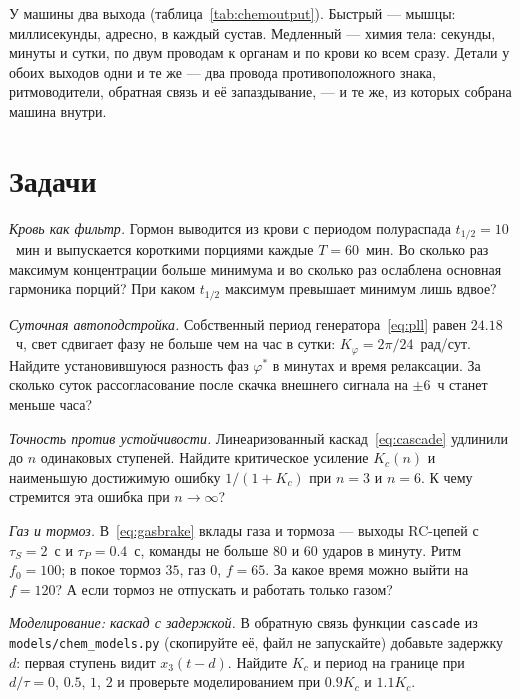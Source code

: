 У машины два выхода (таблица~\ref{tab:chemoutput}). Быстрый --- мышцы: миллисекунды, адресно, в каждый сустав. Медленный --- химия тела: секунды, минуты и сутки, по двум проводам к органам и по крови ко всем сразу. Детали у обоих выходов одни и те же --- два провода противоположного знака, ритмоводители, обратная связь и её запаздывание, --- и те же, из которых собрана машина внутри.

\section{Задачи}

\begin{exercise}[\lvlA]
\label{ex:16:1}
\emph{Кровь как фильтр.} Гормон выводится из крови с периодом полураспада $t_{1/2}=10$~мин и выпускается короткими порциями каждые $T=60$~мин. Во сколько раз максимум концентрации больше минимума и во сколько раз ослаблена основная гармоника порций? При каком $t_{1/2}$ максимум превышает минимум лишь вдвое?
\end{exercise}

\begin{exercise}[\lvlA]
\label{ex:16:2}
\emph{Суточная автоподстройка.} Собственный период генератора~\eqref{eq:pll} равен $24.18$~ч, свет сдвигает фазу не больше чем на час в сутки: $K_\varphi=2\pi/24$~рад/сут. Найдите установившуюся разность фаз $\varphi^*$ в минутах и время релаксации. За сколько суток рассогласование после скачка внешнего сигнала на $\pm6$~ч станет меньше часа?
\end{exercise}

\begin{exercise}[\lvlB]
\label{ex:16:3}
\emph{Точность против устойчивости.} Линеаризованный каскад~\eqref{eq:cascade} удлинили до $n$ одинаковых ступеней. Найдите критическое усиление $K_c(n)$ и наименьшую достижимую ошибку $1/(1+K_c)$ при $n=3$ и $n=6$. К чему стремится эта ошибка при $n\to\infty$?
\end{exercise}

\begin{exercise}[\lvlB]
\label{ex:16:4}
\emph{Газ и тормоз.} В~\eqref{eq:gasbrake} вклады газа и тормоза --- выходы RC-цепей с $\tau_S=2$~с и $\tau_P=0.4$~с, команды не больше $80$ и $60$ ударов в минуту. Ритм $f_0=100$; в покое тормоз $35$, газ $0$, $f=65$. За какое время можно выйти на $f=120$? А если тормоз не отпускать и работать только газом?
\end{exercise}

\begin{exercise}[\lvlB]
\label{ex:16:5}
\emph{Моделирование: каскад с задержкой.} В обратную связь функции \texttt{cascade} из \texttt{models/\allowbreak chem\_models.py} (скопируйте её, файл не запускайте) добавьте задержку $d$: первая ступень видит $x_3(t-d)$. Найдите $K_c$ и период на границе при $d/\tau=0$, $0.5$, $1$, $2$ и проверьте моделированием при $0.9K_c$ и $1.1K_c$.
\end{exercise}


